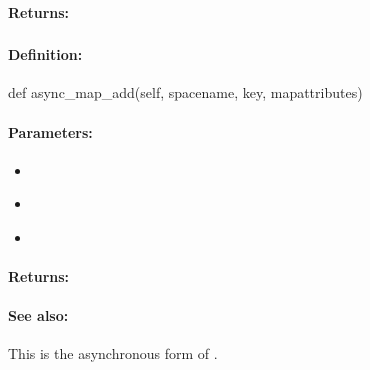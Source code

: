 \paragraph{Returns:}


\pagebreak
\subsubsection{}
\label{api:python:async_map_add}


\paragraph{Definition:}
\begin{pythoncode}
def async_map_add(self, spacename, key, mapattributes)
\end{pythoncode}

\paragraph{Parameters:}
\begin{itemize}[noitemsep]
\item {}\\

\item {}\\

\item {}\\

\end{itemize}

\paragraph{Returns:}


\paragraph{See also:}  This is the asynchronous form of .

\pagebreak
\subsubsection{}
\label{api:python:cond_map_add}


